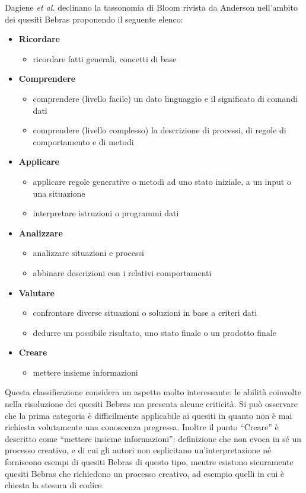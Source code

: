 \documentclass[12pt]{report}
\begin{document}
Dagiene \textit{et al.} \cite{DagieneKEYCIT2015} declinano la tassonomia di Bloom rivista da Anderson nell'ambito dei quesiti Bebras proponendo il seguente elenco:
\begin{itemize}
	\item \textbf{Ricordare} 
	\begin{itemize}
		\item ricordare fatti generali, concetti di base
	\end{itemize}
	\item \textbf{Comprendere} 
	\begin{itemize}
		\item comprendere (livello facile) un dato linguaggio e il significato di comandi dati
		\item comprendere (livello complesso) la descrizione di processi, di regole di comportamento e di metodi
	\end{itemize}
	\item \textbf{Applicare} 
	\begin{itemize}
		\item applicare regole generative o metodi ad uno stato iniziale, a un input o una situazione
		\item interpretare istruzioni o programmi dati
	\end{itemize}
	\item \textbf{Analizzare}
	\begin{itemize}
		\item analizzare situazioni e processi
		\item abbinare descrizioni con i relativi comportamenti
	\end{itemize}
	\item \textbf{Valutare}
	\begin{itemize}
		\item confrontare diverse situazioni o soluzioni in base a criteri dati
		\item dedurre un possibile risultato, uno stato finale o un prodotto finale
	\end{itemize}
	\item \textbf{Creare} 
	\begin{itemize}
		\item mettere insieme informazioni
	\end{itemize}
\end{itemize}

Questa classificazione considera un aspetto molto interessante: le abilità coinvolte nella risoluzione dei quesiti Bebras ma presenta alcune criticità.
Si può osservare che la prima categoria è difficilmente applicabile ai quesiti in quanto non è mai richiesta volutamente una conoscenza pregressa.
Inoltre il punto ``Creare'' è descritto come ``mettere insieme informazioni'': definizione che non evoca in sé un processo creativo, e di cui gli autori non esplicitano un'interpretazione né forniscono esempi di quesiti Bebras di questo tipo, mentre esistono sicuramente quesiti Bebras che richiedono un processo creativo, ad esempio quelli in cui è chiesta la stesura di codice.
\end{document}
